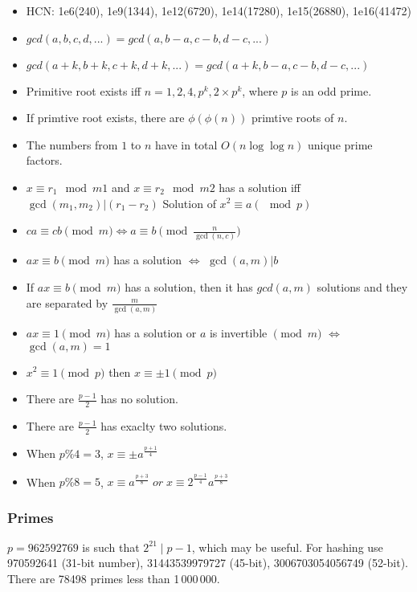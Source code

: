 \begin{itemize}
\item HCN: 1e6(240), 1e9(1344), 1e12(6720), 1e14(17280), 1e15(26880), 1e16(41472)
\item \( gcd(a, b, c, d, ...) = gcd(a, b - a, c - b, d - c, ...) \)
\item \( gcd(a + k, b + k, c + k, d + k, ...) = gcd(a + k, b - a, c - b, d - c, ...) \)
\item Primitive root exists iff \( n = 1, 2, 4, p^k, 2\times p^k \), where \( p \) is an odd prime.
\item If primtive root exists, there are \( \phi(\phi(n)) \) primtive roots of \( n \).
\item The numbers from \( 1 \) to \( n \) have in total \( O(n\log\log n) \) unique prime factors.
\item \( x \equiv r_1 \mod m1 \) and \( x \equiv r_2 \mod m2 \) has a solution iff \( \gcd(m_1, m_2) | (r_1 - r_2) \)
Solution of \( x^2 \equiv a (\mod p) \)
\item \( ca \equiv cb \pmod{m} \iff a \equiv b \pmod{ \frac{n}{\gcd(n, c)}} \)
\item \( ax \equiv b \pmod{m} \) has a solution \( \iff \) \( \gcd(a, m) | b \)
\item If \( ax \equiv b \pmod{m} \) has a solution, then it has \( gcd(a, m) \) solutions and they are separated by \( \frac{m}{\gcd(a, m)} \)
\item \( ax \equiv 1 \pmod{m} \) has a solution or \( a \) is invertible \( \pmod{m} \) \( \iff \) \(\gcd(a, m) = 1 \)
\item \( x^2 \equiv 1 \pmod{p} \) then \( x \equiv \pm 1 \pmod{p} \)
\item There are \( \frac{p - 1}{2} \) has no solution.
\item There are \( \frac{p - 1}{2} \) has exaclty two solutions.
\item When \( p \% 4 = 3 \), \( x \equiv \pm a^{\frac{p + 1}{4}} \)
\item When \( p \% 8 = 5 \), \( x \equiv a^{\frac{p + 3}{8}} \; or \; x \equiv 2^{\frac{p - 1}{4}} a^{\frac{p + 3}{8}} \)
\end{itemize}

\subsubsection{Primes}
  $p=962592769$ is such that $2^{21} \mid p-1$, which may be useful. For hashing
  use 970592641 (31-bit number), 31443539979727 (45-bit), 3006703054056749
  (52-bit). There are 78498 primes less than 1\,000\,000.

